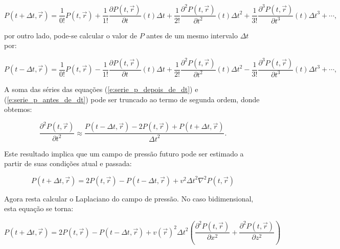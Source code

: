     \begin{equation} \label{e:serie_p_depois_de_dt}
      P(t+{\Delta t}, \vec{r}) =
        \frac{1}{0!} P(t, \vec{r})
        + \frac{1}{1!} \frac{\partial P(t, \vec{r})}{\partial t}(t) {\Delta t}
        + \frac{1}{2!} \frac{\partial^2 P(t, \vec{r})}{\partial t^2}(t) {\Delta t}^2
        + \frac{1}{3!} \frac{\partial^3 P(t, \vec{r})}{\partial t^3}(t) {\Delta t}^3
        + \cdots
        ,
    \end{equation}

    \noindent por outro lado, pode-se calcular o valor de $P$ antes de um mesmo intervalo $\Delta t$ por:

    \begin{equation} \label{e:serie_p_antes_de_dt}
      P(t-{\Delta t}, \vec{r}) =
        \frac{1}{0!} P(t, \vec{r})
        - \frac{1}{1!} \frac{\partial P(t, \vec{r})}{\partial t}(t) {\Delta t}
        + \frac{1}{2!} \frac{\partial^2 P(t, \vec{r})}{\partial t^2}(t) {\Delta t}^2
        - \frac{1}{3!} \frac{\partial^3 P(t, \vec{r})}{\partial t^3}(t) {\Delta t}^3
        + \cdots
        ,
    \end{equation}

    A soma das séries das equações (\ref{e:serie_p_depois_de_dt}) e (\ref{e:serie_p_antes_de_dt}) pode ser truncado ao termo de segunda ordem, donde obtemos:

    \begin{equation} \label{e:fdm_t}
      \frac{\partial^2 P(t, \vec{r})}{\partial t^2} \approx
      \frac{P(t-{\Delta t}, \vec{r}) - 2P(t, \vec{r}) + P(t+{\Delta t}, \vec{r})}{{\Delta t}^2}
      .
    \end{equation}

    Este resultado implica que um campo de pressão futuro pode ser estimado a partir de suas condições atual e passada:

    \begin{equation} \label{e:fdm_tempo_apenas}
      P(t+\Delta t, \vec{r}) = 2 P(t, \vec{r}) - P(t-\Delta t, \vec{r}) + v^2 {\Delta t}^2 \nabla^2 P(t, \vec{r})
    \end{equation}

    Agora resta calcular o Laplaciano do campo de pressão. No caso bidimensional, esta equação se torna:

    \begin{equation} \label{e:fdm_2d}
      P(t+\Delta t, \vec{r}) = 2 P(t, \vec{r}) - P(t-\Delta t, \vec{r}) + v(\vec{r})^2 {\Delta t}^2 \left(\frac{\partial^2 P(t, \vec{r})}{\partial x^2} +\frac{\partial^2 P(t, \vec{r})}{\partial z^2} \right)
    \end{equation}


